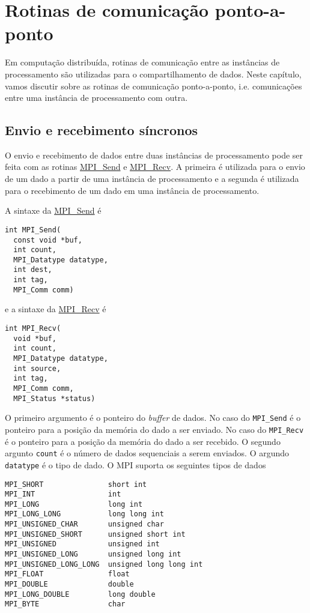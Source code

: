 \section {Rotinas de comunicação ponto-a-ponto}\label{cap_mpi_sec_p2pcom}

Em computação distribuída, rotinas de comunicação entre as instâncias de processamento são utilizadas para o compartilhamento de dados. Neste capítulo, vamos discutir sobre as rotinas de comunicação ponto-a-ponto, i.e. comunicações entre uma instância de processamento com outra.

\subsection {Envio e recebimento síncronos}

O envio e recebimento de dados entre duas instâncias de processamento pode ser feita com as rotinas \href{https://www.open-mpi.org/doc/current/man3/MPI\_Send.3.php}{MPI\_Send} e \href{https://www.open-mpi.org/doc/current/man3/MPI\_Recv.3.php}{MPI\_Recv}. A primeira é utilizada para o envio de um dado a partir de uma instância de processamento e a segunda é utilizada para o recebimento de um dado em uma instância de processamento.

A sintaxe da \href{https://www.open-mpi.org/doc/current/man3/MPI\_Send.3.php}{MPI\_Send} é
\begin{verbatim}
int MPI_Send(
  const void *buf, 
  int count, 
  MPI_Datatype datatype, 
  int dest,
  int tag, 
  MPI_Comm comm)
\end{verbatim}
e a sintaxe da \href{https://www.open-mpi.org/doc/current/man3/MPI\_Send.3.php}{MPI\_Recv} é
\begin{verbatim}
int MPI_Recv(
  void *buf, 
  int count, 
  MPI_Datatype datatype,
  int source, 
  int tag, 
  MPI_Comm comm, 
  MPI_Status *status)
\end{verbatim}

O primeiro argumento é o ponteiro do {\it buffer} de dados. No caso do \verb+MPI_Send+ é o ponteiro para a posição da memória do dado a ser enviado. No caso do \verb+MPI_Recv+ é o ponteiro para a posição da memória do dado a ser recebido. O segundo argunto \verb+count+ é o número de dados sequenciais a serem enviados. O argundo \verb+datatype+ é o tipo de dado. O MPI suporta os seguintes tipos de dados
\begin{verbatim}
MPI_SHORT               short int
MPI_INT                 int
MPI_LONG                long int
MPI_LONG_LONG           long long int
MPI_UNSIGNED_CHAR       unsigned char
MPI_UNSIGNED_SHORT      unsigned short int
MPI_UNSIGNED            unsigned int
MPI_UNSIGNED_LONG       unsigned long int
MPI_UNSIGNED_LONG_LONG  unsigned long long int
MPI_FLOAT               float
MPI_DOUBLE              double
MPI_LONG_DOUBLE         long double
MPI_BYTE                char
\end{verbatim}

